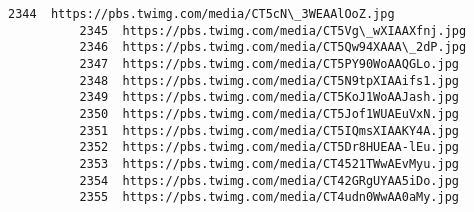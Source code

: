 \documentclass[11pt]{article}
\begin{document}
\begin{Verbatim}[commandchars=\\\{\}]
          2344  https://pbs.twimg.com/media/CT5cN\_3WEAAlOoZ.jpg                                           
          2345  https://pbs.twimg.com/media/CT5Vg\_wXIAAXfnj.jpg                                           
          2346  https://pbs.twimg.com/media/CT5Qw94XAAA\_2dP.jpg                                           
          2347  https://pbs.twimg.com/media/CT5PY90WoAAQGLo.jpg                                           
          2348  https://pbs.twimg.com/media/CT5N9tpXIAAifs1.jpg                                           
          2349  https://pbs.twimg.com/media/CT5KoJ1WoAAJash.jpg                                           
          2350  https://pbs.twimg.com/media/CT5Jof1WUAEuVxN.jpg                                           
          2351  https://pbs.twimg.com/media/CT5IQmsXIAAKY4A.jpg                                           
          2352  https://pbs.twimg.com/media/CT5Dr8HUEAA-lEu.jpg                                           
          2353  https://pbs.twimg.com/media/CT4521TWwAEvMyu.jpg                                           
          2354  https://pbs.twimg.com/media/CT42GRgUYAA5iDo.jpg                                           
          2355  https://pbs.twimg.com/media/CT4udn0WwAA0aMy.jpg                                           
          

\end{Verbatim}
\end{document}
